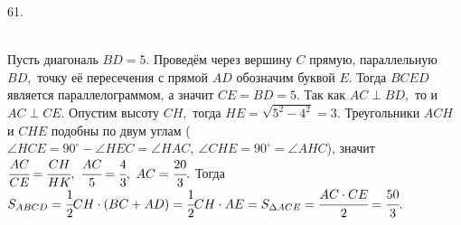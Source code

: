 61. \begin{figure}[ht!]
\end{figure}\\
Пусть диагональ $BD=5.$ Проведём через вершину $C$ прямую, параллельную $BD,$ точку её пересечения с прямой $AD$ обозначим буквой $E.$ Тогда $BCED$ является параллелограммом, а значит $CE=BD=5.$ Так как $AC\perp BD,$ то и $AC\perp CE.$ Опустим высоту $CH,$ тогда $HE=\sqrt{5^2-4^2}=3.$ Треугольники $ACH$ и $CHE$ подобны по двум углам ($\angle HCE=90^\circ-\angle HEC=\angle HAC,\ \angle CHE=90^\circ=\angle AHC$), значит $\cfrac{AC}{CE}=\cfrac{CH}{HK},\ \cfrac{AC}{5}=\cfrac{4}{3},\ AC=\cfrac{20}{3}.$ Тогда $S_{ABCD}=\cfrac{1}{2}CH\cdot(BC+AD)=\cfrac{1}{2}CH\cdot AE=S_{\Delta ACE}=\cfrac{AC\cdot CE}{2}=\cfrac{50}{3}.$\\
